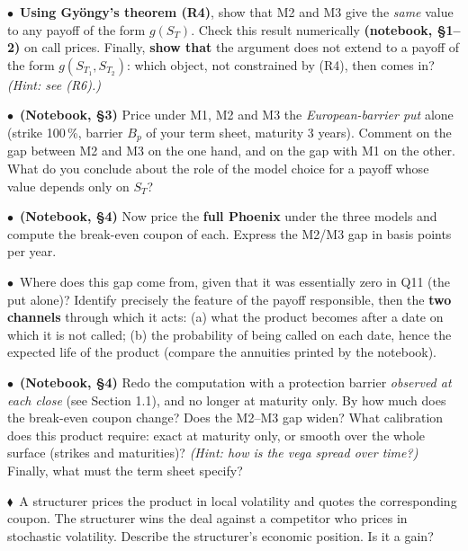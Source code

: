 \documentclass[11pt,a4paper]{article}
\newcommand{\team}{\textcolor{teamblue}{$\bullet$}}
\newcommand{\indiv}{\textcolor{indivred}{$\blacklozenge$}}
\begin{document}
\begin{questions}[resume]
  \item \team\ \textbf{Using Gyöngy's theorem (R4)}, show that M2 and M3 give the \emph{same} value to any payoff
  of the form $g(S_T)$. Check this result numerically \textbf{(notebook, \S1--2)} on call prices. Finally,
  \textbf{show that} the argument does not extend to a payoff of the form $g(S_{T_1}, S_{T_2})$: which object, not
  constrained by (R4), then comes in? \emph{(Hint: see (R6).)}

  \item \team\ \textbf{(Notebook, \S3)} Price under M1, M2 and M3 the \emph{European-barrier put} alone (strike 100\,\%,
  barrier $B_p$ of your term sheet, maturity 3 years). Comment on the gap between M2 and M3 on
  the one hand, and on the gap with M1 on the other. What do you conclude about the role of
  the model choice for a payoff whose value depends only on $S_T$?

  \item \team\ \textbf{(Notebook, \S4)} Now price the \textbf{full Phoenix} under the three models and compute the
  break-even coupon of each. Express the M2/M3 gap in basis points per year.

  \item \team\ Where does this gap come from, given that it was essentially zero in Q11 (the put alone)?
  Identify precisely the feature of the payoff responsible, then the \textbf{two channels} through which it
  acts: (a) what the product becomes after a date on which it is not called; (b) the probability of
  being called on each date, hence the expected life of the product (compare the annuities printed
  by the notebook).

  \item \team\ \textbf{(Notebook, \S4)} Redo the computation with a protection barrier \emph{observed at each close} (see
  Section 1.1), and no longer at maturity only. By how much does the break-even coupon change?
  Does the M2--M3 gap widen? What calibration does this product require: exact at maturity
  only, or smooth over the whole surface (strikes and maturities)? \emph{(Hint: how is the vega spread
  over time?)} Finally, what must the term sheet specify?

  \item \indiv\ A structurer prices the product in local volatility and quotes the corresponding coupon. The
  structurer wins the deal against a competitor who prices in stochastic volatility. Describe the
  structurer's economic position. Is it a gain?


\end{questions}
\end{document}
